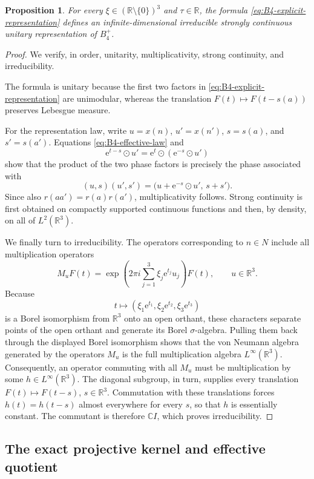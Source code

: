 \documentclass[reqno]{amsart}
\numberwithin{equation}{section}
\newtheorem{proposition}[theorem]{Proposition}
\theoremstyle{definition}
\theoremstyle{remark}
\newcommand{\R}{\mathbb R}
\newcommand{\e}{\mathrm e}
\begin{document}
\begin{proposition}
\label{prop:B4-explicit-representation}
For every $\xi\in(\R\setminus\{0\})^3$ and $\tau\in\R$, the formula
\eqref{eq:B4-explicit-representation} defines an infinite-dimensional
irreducible strongly continuous unitary representation of $B_4^+$.
\end{proposition}

\begin{proof}
We verify, in order, unitarity, multiplicativity, strong continuity, and
irreducibility.

The formula is unitary because the first two factors in
\eqref{eq:B4-explicit-representation} are unimodular, whereas the translation
$F(t)\mapsto F(t-s(a))$ preserves Lebesgue measure.

For the representation law, write $u=x(n)$, $u'=x(n')$,
$s=s(a)$, and $s'=s(a')$.  Equations
\eqref{eq:B4-effective-law} and
\[
 \e^{t-s}\odot u'=\e^t\odot(\e^{-s}\odot u')
\]
show that the product of the two phase factors is precisely the phase
associated with
\[
 (u,s)(u',s')
 =\bigl(u+\e^{-s}\odot u',\,s+s'\bigr).
\]
Since also $r(aa')=r(a)r(a')$, multiplicativity follows.  Strong continuity
is first obtained on compactly supported continuous functions and then, by
density, on all of $L^2(\R^3)$.

We finally turn to irreducibility.  The operators corresponding to $n\in N$
include all multiplication operators
\[
 M_uF(t)=
 \exp\left(2\pi i\sum_{j=1}^3\xi_j\e^{t_j}u_j\right)F(t),
 \qquad u\in\R^3.
\]
Because
\[
 t\longmapsto(\xi_1\e^{t_1},\xi_2\e^{t_2},\xi_3\e^{t_3})
\]
is a Borel isomorphism from $\R^3$ onto an open orthant, these characters
separate points of the open orthant and generate its Borel $\sigma$-algebra.
Pulling them back through the displayed Borel isomorphism shows that the von
Neumann algebra generated by the operators $M_u$ is the full multiplication
algebra $L^\infty(\R^3)$.  Consequently, an operator commuting with all
$M_u$ must be multiplication by some
$h\in L^\infty(\R^3)$.  The diagonal subgroup, in turn, supplies every
translation $F(t)\mapsto F(t-s)$, $s\in\R^3$.  Commutation with these
translations forces $h(t)=h(t-s)$ almost everywhere for every $s$, so that
$h$ is essentially constant.  The commutant is therefore $\mathbb CI$,
which proves irreducibility.
\end{proof}

\subsection{The exact projective kernel and effective quotient}
\end{document}
